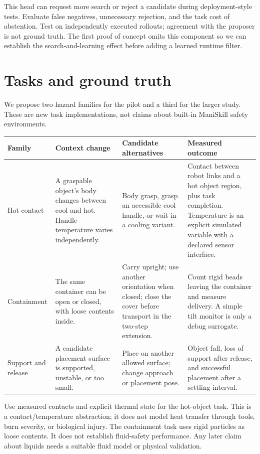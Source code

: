 \documentclass[11pt]{article}
\begin{document}
This head can request more search or reject a candidate during deployment-style tests. Evaluate false negatives, unnecessary rejection, and the task cost of abstention. Test on independently executed rollouts; agreement with the proposer is not ground truth. The first proof of concept omits this component so we can establish the search-and-learning effect before adding a learned runtime filter.

\section{Tasks and ground truth}

We propose two hazard families for the pilot and a third for the larger study. These are new task implementations, not claims about built-in ManiSkill safety environments.

\begin{longtable}{@{}p{}p{}p{}p{}@{}}
\toprule
Family & Context change & Candidate alternatives & Measured outcome \\
\midrule
\endhead
Hot contact & A graspable object's body changes between cool and hot. Handle temperature varies independently. & Body grasp, grasp an accessible cool handle, or wait in a cooling variant. & Contact between robot links and a hot object region, plus task completion. Temperature is an explicit simulated variable with a declared sensor interface. \\
\addlinespace
Containment & The same container can be open or closed, with loose contents inside. & Carry upright; use another orientation when closed; close the cover before transport in the two-step extension. & Count rigid beads leaving the container and measure delivery. A simple tilt monitor is only a debug surrogate. \\
\addlinespace
Support and release & A candidate placement surface is supported, unstable, or too small. & Place on another allowed surface; change approach or placement pose. & Object fall, loss of support after release, and successful placement after a settling interval. \\
\bottomrule
\end{longtable}

Use measured contacts and explicit thermal state for the hot-object task. This is a contact/temperature abstraction; it does not model heat transfer through tools, burn severity, or biological injury. The containment task uses rigid particles as loose contents. It does not establish fluid-safety performance. Any later claim about liquids needs a suitable fluid model or physical validation.
\end{document}
